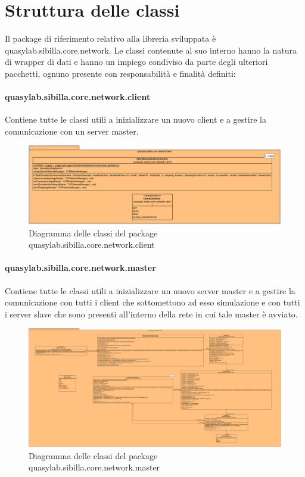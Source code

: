 
\newpage

\section{Struttura delle classi}

Il package di riferimento relativo alla libreria sviluppata è quasylab.sibilla.core.network. Le classi contenute al suo interno hanno la natura di wrapper di dati e hanno un impiego condiviso da parte degli ulteriori pacchetti, ognuno presente con responsabilità e finalità definiti:

\paragraph{quasylab.sibilla.core.network.client} Contiene tutte le classi utili a inizializzare un nuovo client e a gestire la comunicazione con un server master.

\begin{figure}[H]
    \includegraphics[width=\linewidth]{images/quasylab.sibilla.core.network.client.png}
    \captionsetup{justification=centering}
    \caption{Diagramma delle classi del package quasylab.sibilla.core.network.client}
  \end{figure}

\paragraph{quasylab.sibilla.core.network.master} Contiene tutte le classi utili a inizializzare un nuovo server master e a gestire la comunicazione con tutti i client che sottomettono ad esso simulazione e con tutti i server slave che sono presenti all’interno della rete in cui tale master è avviato.

\begin{figure}[H]
    \includegraphics[width=\linewidth]{images/quasylab.sibilla.core.network.master.png}
    \captionsetup{justification=centering}
    \caption{Diagramma delle classi del package quasylab.sibilla.core.network.master}
  \end{figure}

